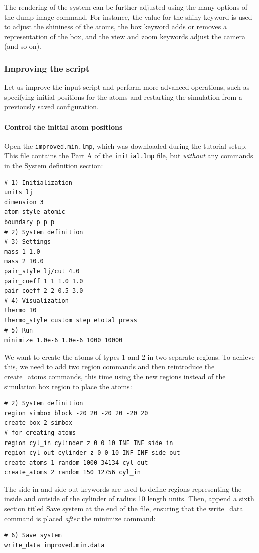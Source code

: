 \documentclass[9pt,tutorial]{livecoms}
\newcommand{\lmpcmd}[1]{\hspace{0pt}\colorbox{listing}{\textcolor{command}{\small{#1}}}\hspace{0pt}} %
\newcommand{\flecmd}[1]{\textcolor{command}{\texttt{#1}}} %
\begin{document}
The rendering of the system can be further adjusted using the many
options of the \lmpcmd{dump image} command.  For instance, the value for the
\lmpcmd{shiny} keyword is used to adjust the shininess of the atoms, the
\lmpcmd{box} keyword adds or removes a representation of the box, and
the \lmpcmd{view} and \lmpcmd{zoom} keywords adjust the camera (and so
on).

\subsubsection{Improving the script}

Let us improve the input script and perform more advanced operations,
such as specifying initial positions for the atoms and restarting the
simulation from a previously saved configuration.

\paragraph{Control the initial atom positions}

Open the \flecmd{improved.min.lmp}, which was downloaded during the
tutorial setup.  This file contains the \lmpcmd{Part A} of the
\flecmd{initial.lmp} file, but \emph{without} any
commands in the \lmpcmd{System definition} section:
\begin{lstlisting}
# 1) Initialization
units lj
dimension 3
atom_style atomic
boundary p p p
# 2) System definition
# 3) Settings
mass 1 1.0
mass 2 10.0
pair_style lj/cut 4.0
pair_coeff 1 1 1.0 1.0
pair_coeff 2 2 0.5 3.0
# 4) Visualization
thermo 10
thermo_style custom step etotal press
# 5) Run
minimize 1.0e-6 1.0e-6 1000 10000
\end{lstlisting}

We want to create the atoms of types 1 and 2 in two separate
regions.  To achieve this, we need to add two \lmpcmd{region} commands and then
reintroduce the \lmpcmd{create\_atoms} commands, this time using the new
regions instead of the simulation box region to place the atoms:
\begin{lstlisting}
# 2) System definition
region simbox block -20 20 -20 20 -20 20
create_box 2 simbox
# for creating atoms
region cyl_in cylinder z 0 0 10 INF INF side in
region cyl_out cylinder z 0 0 10 INF INF side out
create_atoms 1 random 1000 34134 cyl_out
create_atoms 2 random 150 12756 cyl_in
\end{lstlisting}
The \lmpcmd{side in} and \lmpcmd{side out} keywords are used to define
regions representing the inside and outside of the cylinder of radius
10 length units.  Then, append a sixth section titled \lmpcmd{Save system} at the end
of the file, ensuring that the \lmpcmd{write\_data} command is placed \emph{after}
the \lmpcmd{minimize} command:
\begin{lstlisting}
# 6) Save system
write_data improved.min.data
\end{lstlisting}
\end{document}
